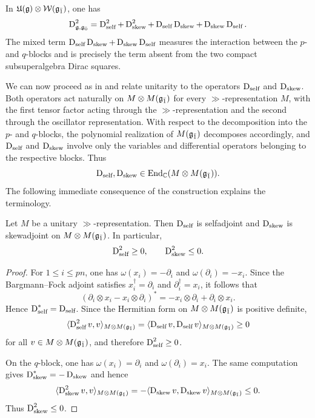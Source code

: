 \begin{remark}\label{rmk::D2_standard_system} In ${\mathfrak U}({\mathfrak{g}})\otimes {\mathcal{W}}({\mathfrak{g}_{\bar{1}}})$, one has
\begin{equation*}
 \operatorname{D}_{{\mathfrak{g}},{\mathfrak{g}_{\bar{0}}}}^{2}
 =
 \operatorname{D}_{{\text{self}}}^{2}
 +
 \operatorname{D}_{{\text{skew}}}^{2}
 +
 \operatorname{D}_{{\text{self}}}\operatorname{D}_{{\text{skew}}}
 +
 \operatorname{D}_{{\text{skew}}}\operatorname{D}_{{\text{self}}}.
\end{equation*}
The mixed term $\operatorname{D}_{{\text{self}}}\operatorname{D}_{{\text{skew}}}
 +
 \operatorname{D}_{{\text{skew}}}\operatorname{D}_{{\text{self}}}$ measures the interaction between the $p$- and
$q$-blocks and is precisely the term absent from the two compact
subsuperalgebra Dirac squares.
\end{remark}

We can now proceed as in \cite{SchmidtDirac} and relate unitarity to the
operators $\operatorname{D}_{{\text{self}}}$ and $\operatorname{D}_{{\text{skew}}}$. Both operators act
naturally on $M\otimes M({\mathfrak{g}_{\bar{1}}})$ for every $\gg$-representation $M$, with
the first tensor factor acting through the $\gg$-representation and the
second through the oscillator representation. With respect to the
decomposition into the $p$- and $q$-blocks, the polynomial realization of
$M({\mathfrak{g}_{\bar{1}}})$ decomposes accordingly, and $\operatorname{D}_{{\text{self}}}$ and
$\operatorname{D}_{{\text{skew}}}$ involve only the variables and differential operators
belonging to the respective blocks. Thus
\begin{equation}
 \operatorname{D}_{{\text{self}}},\operatorname{D}_{{\text{skew}}}
 \in\operatorname{End}_{{\mathbb C}}(M\otimes M({\mathfrak{g}_{\bar{1}}})).
\end{equation}
The following immediate consequence of the construction explains the
terminology.

\begin{lemma}
 Let $M$ be a unitary $\gg$-representation. Then $\operatorname{D}_{{\text{self}}}$ is
 selfadjoint and $\operatorname{D}_{{\text{skew}}}$ is skewadjoint on
 $M\otimes M({\mathfrak{g}_{\bar{1}}})$. In particular,
 \[
  \operatorname{D}_{{\text{self}}}^{2}\geq0,
  \qquad
  \operatorname{D}_{{\text{skew}}}^{2}\leq0.
 \]
\end{lemma}

\begin{proof}
 For $1\leq i\leq pn$, one has $\omega(x_i)=-\partial_i$ and
 $\omega(\partial_i)=-x_i$. Since the Bargmann--Fock adjoint satisfies
 $x_i^{\dagger}=\partial_i$ and $\partial_i^{\dagger}=x_i$, it follows
 that
 \[
  (\partial_i\otimes x_i-x_i\otimes\partial_i)^{\ast}
  =
  -x_i\otimes\partial_i+\partial_i\otimes x_i.
 \]
 Hence $\operatorname{D}_{{\text{self}}}^{\ast}=\operatorname{D}_{{\text{self}}}$. Since the Hermitian form
 on $M\otimes M({\mathfrak{g}_{\bar{1}}})$ is positive definite,
 \[
  \langle\operatorname{D}_{{\text{self}}}^{2}v,v\rangle_{M\otimes M({\mathfrak{g}_{\bar{1}}})}
  =
  \langle\operatorname{D}_{{\text{self}}}v,\operatorname{D}_{{\text{self}}}v\rangle_{M\otimes M({\mathfrak{g}_{\bar{1}}})}
  \geq0
 \]
 for all $v\in M\otimes M({\mathfrak{g}_{\bar{1}}})$, and therefore
 $\operatorname{D}_{{\text{self}}}^{2}\geq0$.

 On the $q$-block, one has $\omega(x_i)=\partial_i$ and
 $\omega(\partial_i)=x_i$. The same computation gives
 $\operatorname{D}_{{\text{skew}}}^{\ast}=-\operatorname{D}_{{\text{skew}}}$ and hence
 \[
  \langle\operatorname{D}_{{\text{skew}}}^{2}v,v\rangle_{M\otimes M({\mathfrak{g}_{\bar{1}}})}
  =
  -\langle\operatorname{D}_{{\text{skew}}}v,\operatorname{D}_{{\text{skew}}}v\rangle_{M\otimes M({\mathfrak{g}_{\bar{1}}})}
  \leq0.
 \]
 Thus $\operatorname{D}_{{\text{skew}}}^{2}\leq0$.
\end{proof}

